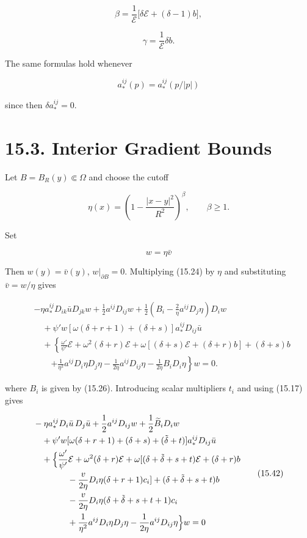 \[
\beta=\frac{1}{\mathscr{E}}\bigl[\delta\mathscr{E}+(\delta-1)b\bigr],
\]

\[
\gamma=\frac{1}{\mathscr{E}}\delta b.
\]


The same formulas hold whenever

\[
a_{*}^{ij}(p)=a_{*}^{ij}(p/|p|)
\]

since then \(\delta a_*^{ij}=0\).

\bigskip

\section*{15.3. Interior Gradient Bounds}

Let \(B=B_R(y)\Subset\Omega\) and choose the cutoff

\[
\tag{15.40}
\eta(x)=\left(1-\frac{|x-y|^{2}}{R^{2}}\right)^{\beta},\qquad \beta \ge 1.
\]

Set

\[
w=\eta \bar{v}
\]

Then \(w(y)=\bar v(y)\), \(w|_{\partial B}=0\). Multiplying (15.24) by
\(\eta\) and substituting \(\bar v=w/\eta\) gives

\begin{equation}\tag{15.41}
\begin{aligned}
&-\eta a_{*}^{ij}D_{ik}\bar{u}D_{jk}w+\frac{1}{2}a^{ij}D_{ij}w
+\frac{1}{2}\left(B_{i}-\frac{2}{\eta}a^{ij}D_{j}\eta\right)D_{i}w\\
&\quad+\psi' w[\omega(\delta+r+1)+(\delta+s)]a_{*}^{ij}D_{ij}\bar{u}\\
&\quad+\left\{\frac{\omega'}{\psi'}\mathscr{E}+\omega^{2}(\delta+r)\mathscr{E}
+\omega[(\delta+s)\mathscr{E}+(\delta+r)b]+(\delta+s)b\right.\\
&\qquad\left.+\frac{1}{\eta^{2}}a^{ij}D_{i}\eta D_{j}\eta
-\frac{1}{2\eta}a^{ij}D_{ij}\eta-\frac{1}{2\eta}B_{i}D_{i}\eta\right\}w=0.
\end{aligned}
\end{equation}

where \(B_i\) is given by (15.26). Introducing scalar multipliers \(t_i\)
and using (15.17) gives

\begin{equation}
\begin{aligned}
&-\eta a_*^{ij}D_i\bar u\,D_j\bar u+\frac12 a^{ij}D_{ij}w+\frac12 \widetilde B_iD_iw\\
&\quad +\psi'w[\omega(\delta+r+1)+(\delta+s)+(\tilde\delta+t)]a_*^{ij}D_{ij}\bar u\\
&\quad +\Bigl\{\frac{\omega'}{\psi'}\mathcal E+\omega^2(\delta+r)\mathcal E+\omega[(\delta+\tilde\delta+s+t)\mathcal E+(\delta+r)b\\
&\qquad\qquad -\frac{v}{2\eta}D_i\eta(\delta+r+1)c_i]+(\delta+\tilde\delta+s+t)b\\
&\qquad\qquad -\frac{v}{2\eta}D_i\eta(\delta+\tilde\delta+s+t+1)c_i\\
&\qquad\qquad +\frac{1}{\eta^2}a^{ij}D_i\eta D_j\eta-\frac{1}{2\eta}a^{ij}D_{ij}\eta\Bigr\}w=0
\end{aligned}
\tag{15.42}
\end{equation}

